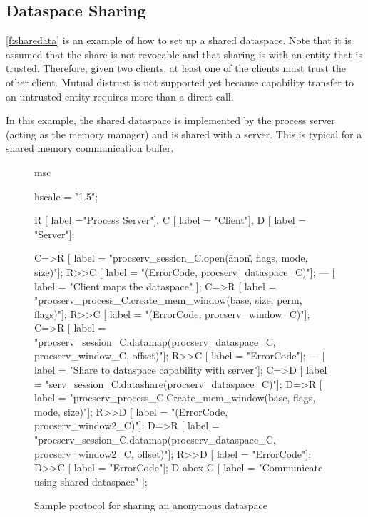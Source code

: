 \subsection{Dataspace Sharing}

\autoref{f:sharedata} is an example of how to set up a shared dataspace. Note that it is assumed that the share is not revocable and that sharing is with an entity that is trusted. Therefore, given two clients, at least one of the clients must trust the other client. Mutual distrust is not supported yet because capability transfer to an untrusted entity requires more than a direct call.

In this example, the shared dataspace is implemented by the process server (acting as the memory manager) and is shared with a server. This is typical for a shared memory communication buffer.

\begin{figure}[h]
  \begin{center}
    \begin{msc}
      msc {
        hscale = "1.5";

        R [ label ="Process Server"],
        C [ label = "Client"],
        D [ label = "Server"];
        
        C=>R [ label = "procserv\_session\_C.open(\"anon\", flags, mode, size)"];
        R>>C [ label = "(ErrorCode, procserv\_dataspace\_C)"];
        --- [ label = "Client maps the dataspace" ];
        C=>R [ label = "procserv\_process\_C.create\_mem\_window(base, size, perm, flags)"];
        R>>C [ label = "(ErrorCode, procserv\_window\_C)"];
        C=>R [ label = "procserv\_session\_C.datamap(procserv\_dataspace\_C, procserv\_window\_C, offset)"];
        R>>C [ label = "ErrorCode"];
        --- [ label = "Share to dataspace capability with server"];
        C=>D [ label = "serv\_session\_C.datashare(procserv\_dataspace\_C)"];
        D=>R [ label = "procserv\_process\_C.Create\_mem\_window(base, flags, mode, size)"];
        R>>D [ label = "(ErrorCode, procserv\_window2\_C)"];
        D=>R [ label = "procserv\_session\_C.datamap(procserv\_dataspace\_C, procserv\_window2\_C, offset)"];
        R>>D [ label = "ErrorCode"];
        D>>C [ label = "ErrorCode"];
        D abox C [ label = "Communicate using shared dataspace" ];
      }
    \end{msc}
  \end{center}
  \caption{Sample protocol for sharing an anonymous dataspace}
  \label{f:sharedata}
\end{figure}


